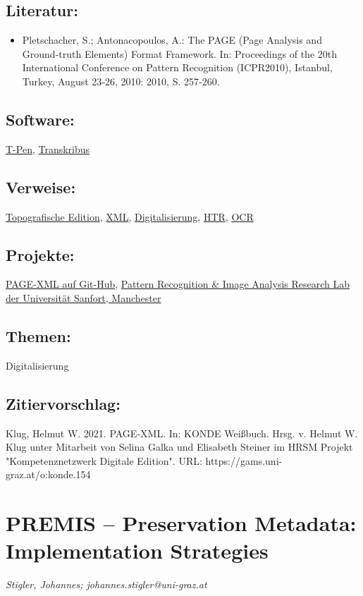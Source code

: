 \documentclass{article}
\begin{document}
        \subsection*{Literatur:}\begin{itemize}\item Pletschacher, S.; Antonacopoulos, A.: The PAGE (Page Analysis and Ground-truth Elements) Format Framework. In: Proceedings of the 20th International Conference on Pattern Recognition (ICPR2010), Istanbul, Turkey, August 23‐26, 2010: 2010, S. 257‐260.\end{itemize}\subsection*{Software:}\href{http://t-pen.org/TPEN/}{T-Pen}, \href{https://transkribus.eu/Transkribus/}{Transkribus}\subsection*{Verweise:}\href{https://gams.uni-graz.at/o:konde.196}{Topografische Edition}, \href{https://gams.uni-graz.at/o:konde.215}{XML}, \href{https://gams.uni-graz.at/o:konde.60}{Digitalisierung}, \href{https://gams.uni-graz.at/o:konde.224}{HTR}, \href{https://gams.uni-graz.at/o:konde.149}{OCR}\subsection*{Projekte:}\href{https://github.com/PRImA-Research-Lab/PAGE-XML}{PAGE-XML auf Git-Hub}, \href{https://www.primaresearch.org}{Pattern Recognition & Image Analysis Research Lab der Universität Sanfort, Manchester}\subsection*{Themen:}Digitalisierung\subsection*{Zitiervorschlag:}Klug, Helmut W. 2021. PAGE-XML. In: KONDE Weißbuch. Hrsg. v. Helmut W. Klug unter Mitarbeit von Selina Galka und Elisabeth Steiner im HRSM Projekt "Kompetenznetzwerk Digitale Edition". URL: https://gams.uni-graz.at/o:konde.154\newpage\section*{PREMIS – Preservation Metadata: Implementation Strategies} \emph{Stigler, Johannes; johannes.stigler@uni-graz.at }\\
        
\end{document}
